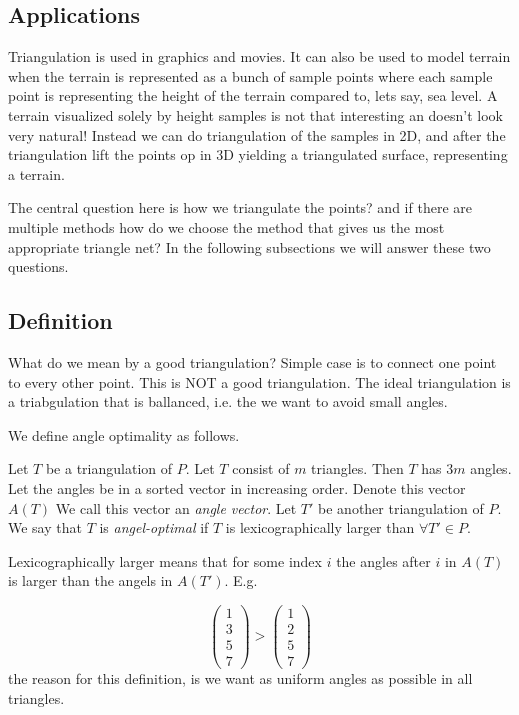 \documentclass[10pt]{article}
\begin{document}
\subsection{Applications} %
\label{sub:applications}
Triangulation is used in graphics and movies. It can also be used to model terrain when the terrain is represented as a bunch of sample points where each sample point is representing the height of the terrain compared to, lets say, sea level. A terrain visualized solely by height samples is not that interesting an doesn't look very natural! Instead we can do triangulation of the samples in 2D, and after the triangulation lift the points op in 3D yielding a triangulated surface, representing a terrain. 

The central question here is how we triangulate the points? and if there are multiple methods how do we choose the method that gives us the most appropriate triangle net? In the following subsections we will answer these two questions.


\subsection{Definition} %
\label{sub:definition}

What do we mean by a good triangulation?
Simple case is to connect one point to every other point. This is NOT a good triangulation. The ideal triangulation is a triabgulation that is ballanced, i.e. the we want to avoid small angles. 

We define angle optimality as follows.

Let $T$ be a triangulation of $P$. Let $T$ consist of $m$ triangles. Then $T$ has $3m$ angles. Let the angles be in a sorted vector in increasing order. Denote this vector $A(T)$ We call this vector an \emph{angle vector}. Let $T'$ be another triangulation of $P$. We say that $T$ is \emph{angel-optimal} if $T$ is lexicographically larger than $\forall T'\in P$.

Lexicographically larger means that for some index $i$ the angles after $i$ in $A(T)$ is larger than the angels in $A(T')$. E.g.

\begin{equation} 
\left(
\begin{array}{r} 
   1  \\
   3 \\
   5 \\
   7 
\end{array} 
\right) >   
\left(
\begin{array}{r} 
   1  \\
   2 \\
   5 \\
   7 
\end{array} 
\right)
\end{equation} 
the reason for this definition, is we want as uniform angles as possible in all triangles.
\end{document}
